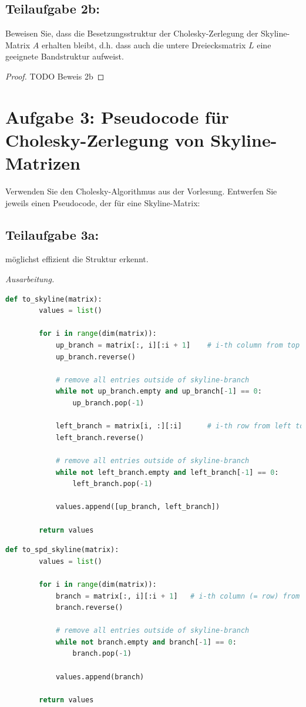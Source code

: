 \documentclass[]{article}
\newenvironment{ausarbeitung}{\vspace{3mm}\noindent\textit{Ausarbeitung.}}{}
\begin{document}
\subsection*{Teilaufgabe 2b:}
Beweisen Sie, dass die Besetzungsstruktur der Cholesky-Zerlegung der Skyline-Matrix $A$ erhalten bleibt, d.h. dass auch die untere Dreiecksmatrix $L$ eine geeignete Bandstruktur aufweist.

\begin{proof}
	TODO Beweis 2b
\end{proof}
\newpage



\section*{Aufgabe 3: Pseudocode für Cholesky-Zerlegung von Skyline-Matrizen}
Verwenden Sie den Cholesky-Algorithmus aus der Vorlesung. Entwerfen Sie jeweils einen Pseudocode, der für eine Skyline-Matrix:


\subsection*{Teilaufgabe 3a:}
möglichst effizient die Struktur erkennt.

\begin{ausarbeitung}
	\begin{lstlisting}[language=Python, caption=Strukturerkennung einer nicht notwendigerweise symmetrischen Skyline-Matrix]
	def to_skyline(matrix):
		values = list()
	
		for i in range(dim(matrix)):
			up_branch = matrix[:, i][:i + 1]	# i-th column from top to diagonal
			up_branch.reverse()
 	    
			# remove all entries outside of skyline-branch
			while not up_branch.empty and up_branch[-1] == 0: 
				up_branch.pop(-1)
	
			left_branch = matrix[i, :][:i]		# i-th row from left to diagonal
			left_branch.reverse()
			
			# remove all entries outside of skyline-branch
			while not left_branch.empty and left_branch[-1] == 0:
				left_branch.pop(-1)
			
			values.append([up_branch, left_branch])
	
		return values
	\end{lstlisting}
	
	\begin{lstlisting}[language=Python, caption=Strukturerkennung einer symmetrischen positiv definiten Skyline-Matrix]
	def to_spd_skyline(matrix):
		values = list()
			
		for i in range(dim(matrix)):
			branch = matrix[:, i][:i + 1]	# i-th column (= row) from top to diagonal
			branch.reverse()
		
			# remove all entries outside of skyline-branch
			while not branch.empty and branch[-1] == 0:
				branch.pop(-1)
				
			values.append(branch)
			
		return values
	\end{lstlisting}
\end{ausarbeitung}
\end{document}
